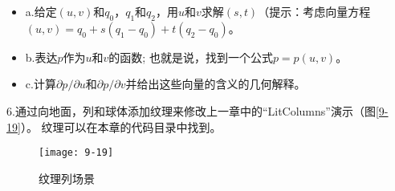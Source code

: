 \begin{itemize}
  \item a.给定$(u,v)$和$q_{0}$，$q_{1}$和$q_{2}$，用$u$和$v$求解$(s,t)$（提示：考虑向量方程$(u,v)=q_{0}+s(q_{1}-q_{0})+t(q_{2}-q_{0})$。
  \item b.表达$p$作为$u$和$v$的函数; 也就是说，找到一个公式$p=p(u,v)$。
  \item c.计算$\partial p/\partial u$和$\partial p/\partial v$并给出这些向量的含义的几何解释。
\end{itemize}

\begin{flushleft}
6.通过向地面，列和球体添加纹理来修改上一章中的“LitColumns”演示（图\ref{9-19}）。 纹理可以在本章的代码目录中找到。
\end{flushleft}

\begin{figure}[h]
    \texttt{[image: 9-19]}
    \centering
    \caption{纹理列场景}
    \label{fig:9-19}
\end{figure}
